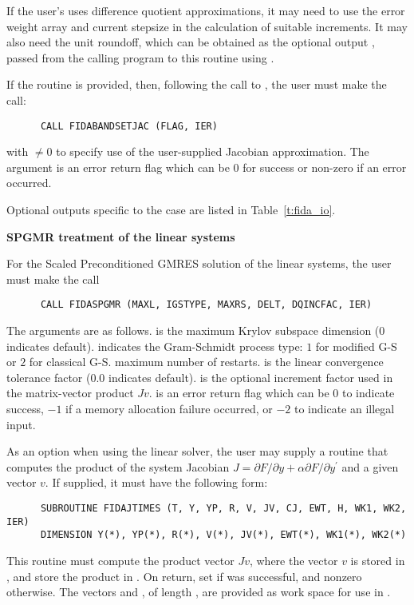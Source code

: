 \begin{Steps}
  If the user's  uses difference quotient approximations, it
  may need to use the error weight array  and current stepsize 
  in the calculation of suitable increments.  It may also need the unit
  roundoff, which can be obtained as the optional output ,
  passed from the calling program to this routine using .

  If the  routine is provided, then, following the call to ,
  the user must make the call:
\begin{verbatim}
      CALL FIDABANDSETJAC (FLAG, IER)
\end{verbatim}
  with  $\neq 0$ to specify use of the user-supplied Jacobian approximation.
  The argument  is an error return flag which can be $0$ 
  for success or non-zero if an error occurred.
  
  Optional outputs specific to the {\band} case are listed in Table~\ref{t:fida_io}.

  {\s}{\p} {\bf SPGMR treatment of the linear systems}
  
  For the Scaled Preconditioned GMRES solution of the linear systems,
  the user must make the call
\begin{verbatim}
      CALL FIDASPGMR (MAXL, IGSTYPE, MAXRS, DELT, DQINCFAC, IER)
\end{verbatim}
  The arguments are as follows.
   is the maximum Krylov subspace dimension ($0$ indicates default).
   indicates the Gram-Schmidt process type: 
  $1$ for modified G-S or $2$ for classical G-S.
   maximum number of restarts.
   is the linear convergence tolerance factor ($0.0$ indicates default).
   is the optional increment factor used in the matrix-vector product $Jv$.
   is an error return flag which can be $0$ to indicate success, $-1$
  if a memory allocation failure occurred, or $-2$ to indicate an illegal input.
  
  As an option when using the {\spgmr} linear solver, the user may supply a 
  routine that computes the product of the system Jacobian
  $J = \partial F / \partial y + \alpha \partial F / \partial y^\prime$
  and a given vector $v$.  If supplied, it must have the following form:
\begin{verbatim}
      SUBROUTINE FIDAJTIMES (T, Y, YP, R, V, JV, CJ, EWT, H, WK1, WK2, IER)
      DIMENSION Y(*), YP(*), R(*), V(*), JV(*), EWT(*), WK1(*), WK2(*)
\end{verbatim}
  This routine must compute the product vector $Jv$, where the vector $v$ is
  stored in , and store the product in .  On return, set
   if  was successful, and nonzero otherwise.
  The vectors  and , of length , are
  provided as work space for use in .


\end{Steps}
